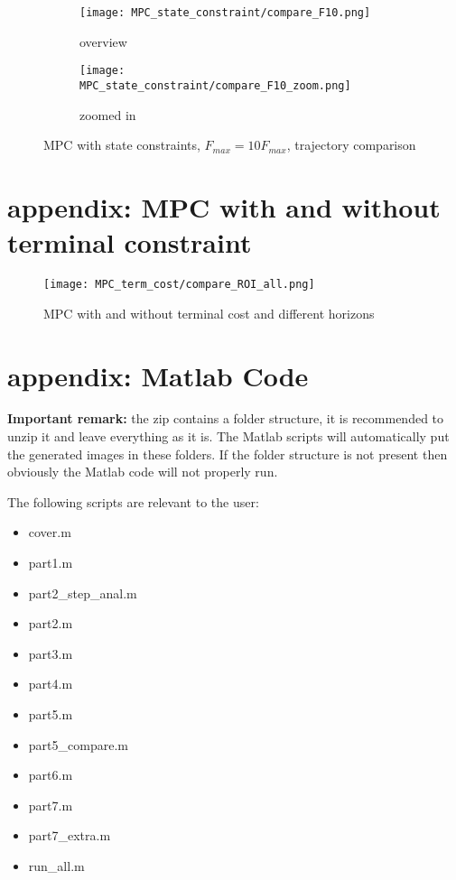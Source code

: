 	\begin{figure}[H]
		\centering
		\begin{subfigure}[b]{0.45\textwidth}
			\texttt{[image: MPC\_state\_constraint/compare\_F10.png]}
			\caption{overview}
		\end{subfigure}
		\begin{subfigure}[b]{0.45\textwidth}
			\texttt{[image: MPC\_state\_constraint/compare\_F10\_zoom.png]}
			\caption{zoomed in}
		\end{subfigure}
		\caption{MPC with state constraints, $F_{max}=10F_{max}$, trajectory comparison}
		\label{fig:MPC with state constraints increased F, traject comparison}
	\end{figure}

\section{appendix: MPC with and without terminal constraint}
	\begin{figure}[H]
		\centering
		\texttt{[image: MPC\_term\_cost/compare\_ROI\_all.png]}
		\caption{MPC with and without terminal cost and different horizons}
		\label{fig:MPC with and without terminal cost and different horizons}
	\end{figure}
\clearpage
\section{appendix: Matlab Code}

\textbf{Important remark:} the zip contains a folder structure, it is recommended to unzip it and leave everything as it is. The Matlab scripts will automatically put the generated images in these folders. If the folder structure is not present then obviously the Matlab code will not properly run.

The following scripts are relevant to the user:
\begin{itemize}
	\item cover.m
	\item part1.m
	\item part2\_step\_anal.m
	\item part2.m
	\item part3.m
	\item part4.m
	\item part5.m
	\item part5\_compare.m
	\item part6.m
	\item part7.m
	\item part7\_extra.m
	\item run\_all.m
\end{itemize}


